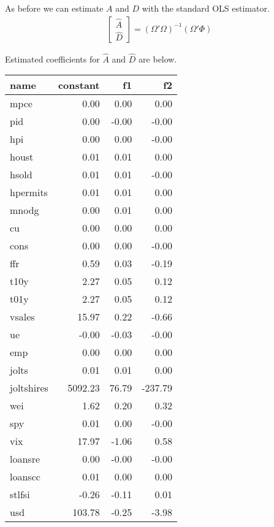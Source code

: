 \documentclass[11pt, letterpaper]{article}\usepackage[]{graphicx}\usepackage[]{color}
\begin{document}
As before we can estimate $A$ and $D$ with the standard OLS estimator.
\begin{align*}
\begin{bmatrix}
	\widehat{A}\\
	\widehat{D}
\end{bmatrix} =
(\Omega' \Omega)^{-1} (\Omega'\Phi)
\end{align*}

Estimated coefficients for $\widehat{A}$ and $\widehat{D}$ are below.
\begin{table}[H]
\centering
\begingroup\footnotesize
\begin{tabular}{lrrr}
  \hline
name & constant & f1 & f2 \\ 
  \hline
mpce & 0.00 & 0.00 & 0.00 \\ 
  pid & 0.00 & -0.00 & -0.00 \\ 
  hpi & 0.00 & 0.00 & -0.00 \\ 
  houst & 0.01 & 0.01 & 0.00 \\ 
  hsold & 0.01 & 0.01 & -0.00 \\ 
  hpermits & 0.01 & 0.01 & 0.00 \\ 
  mnodg & 0.00 & 0.01 & 0.00 \\ 
  cu & 0.00 & 0.00 & 0.00 \\ 
  cons & 0.00 & 0.00 & -0.00 \\ 
  ffr & 0.59 & 0.03 & -0.19 \\ 
  t10y & 2.27 & 0.05 & 0.12 \\ 
  t01y & 2.27 & 0.05 & 0.12 \\ 
  vsales & 15.97 & 0.22 & -0.66 \\ 
  ue & -0.00 & -0.03 & -0.00 \\ 
  emp & 0.00 & 0.00 & 0.00 \\ 
  jolts & 0.01 & 0.01 & 0.00 \\ 
  joltshires & 5092.23 & 76.79 & -237.79 \\ 
  wei & 1.62 & 0.20 & 0.32 \\ 
  spy & 0.01 & 0.00 & -0.00 \\ 
  vix & 17.97 & -1.06 & 0.58 \\ 
  loansre & 0.00 & -0.00 & -0.00 \\ 
  loanscc & 0.01 & 0.00 & 0.00 \\ 
  stlfsi & -0.26 & -0.11 & 0.01 \\ 
  usd & 103.78 & -0.25 & -3.98 \\ 

\end{tabular}
\end{table}
\end{document}
